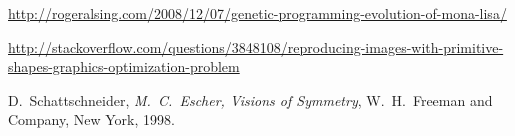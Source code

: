 









\url{http://rogeralsing.com/2008/12/07/genetic-programming-evolution-of-mona-lisa/}

\url{http://stackoverflow.com/questions/3848108/reproducing-images-with-primitive-shapes-graphics-optimization-problem}

D.~Schattschneider, \emph{M.~C.~Escher, Visions of Symmetry}, W.~H.~Freeman and Company, New York, 1998.

